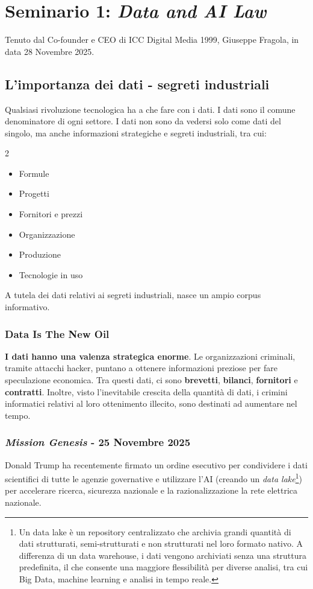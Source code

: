 
\chapter{Seminario 1: \textit{Data and AI Law}}
Tenuto dal Co-founder e CEO di ICC Digital Media 1999, Giuseppe Fragola, in data 28 Novembre 2025.

\section{L'importanza dei dati - segreti industriali}
Qualsiasi rivoluzione tecnologica ha a che fare con i dati. I dati sono il comune denominatore di ogni settore. I dati non sono da vedersi solo come dati del singolo, ma anche informazioni strategiche e  segreti industriali, tra cui:

\begin{multicols}{2}
	\begin{itemize}
		\item Formule
		\item Progetti
		\item Fornitori e prezzi
		\item Organizzazione
		\item Produzione
		\item Tecnologie in uso
	\end{itemize}
\end{multicols}

A tutela dei dati relativi ai segreti industriali, nasce un ampio corpus informativo.

\subsection{Data Is The New Oil}
\textbf{I dati hanno una valenza strategica enorme}.
Le organizzazioni criminali, tramite attacchi hacker, puntano a ottenere informazioni preziose per fare speculazione economica. Tra questi dati, ci sono \textbf{brevetti}, \textbf{bilanci}, \textbf{fornitori} e \textbf{contratti}. Inoltre, visto l'inevitabile crescita della quantità di dati, i crimini informatici relativi al loro ottenimento illecito, sono destinati ad aumentare nel tempo. 

\subsection{\textit{Mission Genesis} - 25 Novembre 2025}
Donald Trump ha recentemente firmato un ordine esecutivo per condividere i dati scientifici di tutte le agenzie governative e utilizzare l'AI (creando un \textit{data lake}\footnote{Un data lake è un
	repository centralizzato che archivia grandi quantità di dati strutturati, semi-strutturati e non strutturati nel loro formato nativo. A differenza di un data warehouse, i dati vengono archiviati senza una struttura predefinita, il che consente una maggiore flessibilità per diverse analisi, tra cui Big Data, machine learning e analisi in tempo reale.}) per accelerare ricerca, sicurezza nazionale e la razionalizzazione la rete elettrica nazionale.

